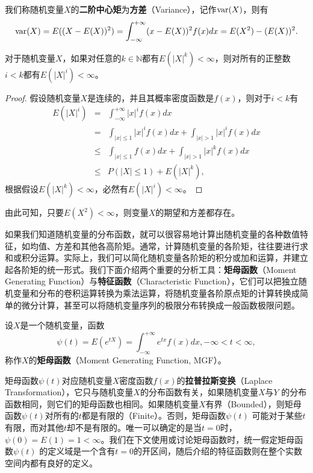 \begin{definition}[方差]
我们称随机变量$X$的\textbf{二阶中心矩}为\textbf{方差}（Variance），记作$\operatorname{\mathrm{var}}(X)$，则有
\[
    \operatorname{\mathrm{var}}(X) = E((X-E(X))^2) = \int_{-\infty}^{+\infty} (x-E(X))^2 f(x) dx =  E(X^2) - (E(X))^2.
\]
\end{definition}

\begin{theorem}
对于随机变量$X$，如果对任意的$k\in \mathbb N$都有$E(|X|^k)<\infty$，则对所有的正整数$i<k$都有$E(|X|^i)<\infty$。
\end{theorem}
\begin{proof}
假设随机变量$X$是连续的，并且其概率密度函数是$f(x)$，则对于$i<k$有
\[
\begin{array}{lcl}
    E(|X|^i) &=& \int_{-\infty}^{+\infty} |x|^i f(x) dx\\
    &=& \int_{|x|\le 1} |x|^i f(x) dx + \int_{|x|> 1} |x|^i f(x) dx\\
    &\le& \int_{|x|\le 1} f(x) dx + \int_{|x|> 1} |x|^k f(x) dx\\
    &\le& P(|X|\le 1) + E(|X|^k),
\end{array}
\]
根据假设$E(|X|^k)<\infty$，必然有$E(|X|^i) < \infty$。
\end{proof}
由此可知，只要$E(X^2)<\infty$，则变量$X$的期望和方差都存在。

如果我们知道随机变量的分布函数，就可以很容易地计算出随机变量的各种数值特征，如均值、方差和其他各高阶矩。通常，计算随机变量的各阶矩，往往要进行求和或积分运算。实际上，我们可以简化随机变量各阶矩的积分或加和运算，并建立起各阶矩的统一形式。我们下面介绍两个重要的分析工具：\textbf{矩母函数}（Moment Generating Function）与\textbf{特征函数}（Characteristic Function），它们可以把独立随机变量和分布的卷积运算转换为乘法运算，将随机变量各阶原点矩的计算转换成简单的微分计算，甚至可以将随机变量序列的极限分布转换成一般函数极限问题。

\begin{definition}[矩母函数]
设$X$是一个随机变量，函数
\[
    \psi(t) = E(e^{tX}) = \int_{-\infty}^{+\infty} e^{tx} f(x)dx, -\infty < t < \infty,
\]
称作$X$的\textbf{矩母函数}（Moment Generating Function, MGF）。
\end{definition}
矩母函数$\psi(t)$对应随机变量$X$密度函数$f(x)$的\textbf{拉普拉斯变换}（Laplace Transformation），它只与随机变量$X$的分布函数有关，如果随机变量$X$与$Y$ 的分布函数相同，则它们的矩母函数也相同。如果随机变量$X$有界（Bounded），则矩母函数$\psi(t)$对所有的$t$都是有限的（Finite）。否则，矩母函数$\psi(t)$ 可能对于某些$t$有限，而对其他$t$却不是有限的。唯一可以确定的是当$t=0$时，$\psi(0)=E(1)=1<\infty$。我们在下文使用或讨论矩母函数时，统一假定矩母函数$\psi(t)$ 的定义域是一个含有$t=0$的开区间，随后介绍的特征函数则在整个实数空间内都有良好的定义。

